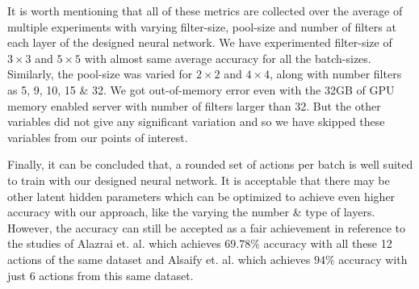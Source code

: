 \documentclass[conference]{IEEEtran}
\begin{document}
It is worth mentioning that all of these metrics are collected over the average of multiple experiments with varying filter-size, pool-size and number of filters at each layer of the designed neural network. We have experimented filter-size of $3\times3$ and $5\times5$ with almost same average accuracy for all the batch-sizes. Similarly, the pool-size was varied for $2\times2$ and $4\times4$, along with number filters as 5, 9, 10, 15 \& 32. We got out-of-memory error even with the 32GB of GPU memory enabled server with number of filters larger than 32. But the other variables did not give any significant variation and so we have skipped these variables from our points of interest. 

Finally, it can be concluded that, a rounded set of actions per batch is well suited to train with our designed neural network. It is acceptable that there may be other latent hidden parameters which can be optimized to achieve even higher accuracy with our approach, like the varying the number \& type of layers. However, the accuracy can still be accepted as a fair achievement in reference to the studies of Alazrai et. al. \cite{csi_dataset_recent_refer1} which achieves $69.78\%$ accuracy with all these 12 actions of the same dataset and Alsaify et. al.\cite{csi_dataset_recent_refer2} which achieves $94\%$ accuracy with just 6 actions from this same dataset.
\end{document}
